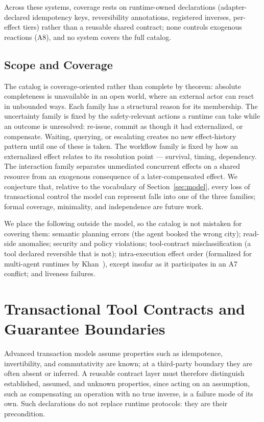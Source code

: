 \documentclass[runningheads]{comsis3}
\begin{document}
Across these systems, coverage rests on runtime-owned declarations
(adapter-declared idempotency keys, reversibility annotations, registered
inverses, per-effect tiers) rather than a reusable shared contract; none
controls exogenous reactions (A8), and no system covers the full catalog.

\subsection{Scope and Coverage}
\label{sec:coverage}

The catalog is coverage-oriented rather than complete by theorem: absolute
completeness is unavailable in an open world, where an external actor can
react in unbounded ways. Each family has a structural reason for its
membership. The uncertainty family is fixed by the safety-relevant actions a runtime
can take while an outcome is unresolved: re-issue, commit as though it had
externalized, or compensate. Waiting, querying, or escalating creates no new
effect-history pattern until one of these is taken. The workflow family is fixed by how an
externalized effect relates to its resolution point --- survival, timing,
dependency. The interaction family separates unmediated concurrent effects
on a shared resource from an exogenous consequence of a later-compensated
effect. We conjecture that, relative to the vocabulary of
Section~\ref{sec:model}, every loss of transactional control the model can
represent falls into one of the three families; formal coverage,
minimality, and independence are future work.

We place the following outside the model, so the catalog is not mistaken for covering them: semantic planning errors (the agent booked the wrong city); read-side
anomalies; security and policy
violations; tool-contract misclassification (a tool declared reversible that
is not); intra-execution effect order (formalized for multi-agent runtimes
by Khan~\cite{khan2026verified}), except insofar as it participates in an A7
conflict; and liveness failures.

\section{Transactional Tool Contracts and Guarantee Boundaries}
\label{sec:contracts}
\label{sec:unknown}

Advanced transaction models assume properties such as idempotence,
invertibility, and commutativity are known; at a third-party boundary they
are often absent or inferred. A reusable contract layer must
therefore distinguish established, assumed, and unknown properties, since
acting on an assumption, such as compensating an operation with no true inverse, is a failure mode of its own. Such declarations do not replace runtime
protocols: they are their precondition.
\end{document}
